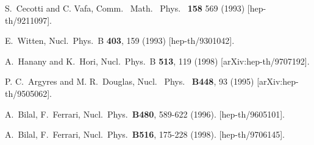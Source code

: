 \documentclass[epsfig,12pt]{article}
\newcommand{\ntwo}{${\mathcal N}=2\,$}
\begin{document}
\begin{thebibliography}{99}
S.~Cecotti and C. Vafa,
Comm. \ Math. \ Phys. \ {\bf 158} 569 (1993)
[hep-th/9211097].

E.~Witten,
  Nucl.\ Phys.\ B {\bf 403}, 159 (1993)
  [hep-th/9301042].

A.~Hanany and K.~Hori,
  Nucl.\ Phys.\  B {\bf 513}, 119 (1998)
  [arXiv:hep-th/9707192].

P. C.~Argyres and M. R.~Douglas,
Nucl. \ Phys. \ {\bf B448}, 93 (1995)   
[arXiv:hep-th/9505062].
  
  A.~Bilal, F.~Ferrari,
  Nucl.\ Phys.\  {\bf B480}, 589-622 (1996).
  [hep-th/9605101].

  A.~Bilal, F.~Ferrari,
  Nucl.\ Phys.\  {\bf B516}, 175-228 (1998).
  [hep-th/9706145].

\end{thebibliography}
\end{document}
